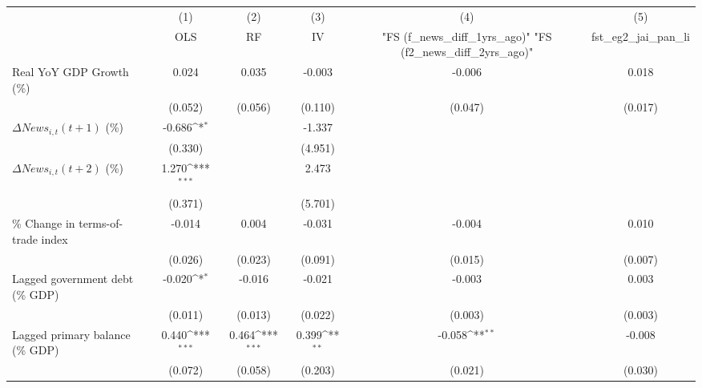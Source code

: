 {
\def\sym#1{\ifmmode^{#1}\else\(^{#1}\)\fi}
\begin{tabular}{l*{5}{c}}
\toprule
                    &\multicolumn{1}{c}{(1)}&\multicolumn{1}{c}{(2)}&\multicolumn{1}{c}{(3)}&\multicolumn{1}{c}{(4)}&\multicolumn{1}{c}{(5)}\\
                    &\multicolumn{1}{c}{OLS}&\multicolumn{1}{c}{RF}&\multicolumn{1}{c}{IV}&\multicolumn{1}{c}{ "FS (f_news_diff_1yrs_ago)"  "FS (f2_news_diff_2yrs_ago)" }&\multicolumn{1}{c}{fst_eg2_jai_pan_li}\\
\midrule
Real YoY GDP Growth (\%)&       0.024         &       0.035         &      -0.003         &      -0.006         &       0.018         \\
                    &     (0.052)         &     (0.056)         &     (0.110)         &     (0.047)         &     (0.017)         \\
\addlinespace
$ \Delta News_{i,t}(t+1)$ (\%)&      -0.686\sym{*}  &                     &      -1.337         &                     &                     \\
                    &     (0.330)         &                     &     (4.951)         &                     &                     \\
\addlinespace
$ \Delta News_{i,t}(t+2)$ (\%)&       1.270\sym{***}&                     &       2.473         &                     &                     \\
                    &     (0.371)         &                     &     (5.701)         &                     &                     \\
\addlinespace
\% Change in terms-of-trade index&      -0.014         &       0.004         &      -0.031         &      -0.004         &       0.010         \\
                    &     (0.026)         &     (0.023)         &     (0.091)         &     (0.015)         &     (0.007)         \\
\addlinespace
Lagged government debt (\% GDP)&      -0.020\sym{*}  &      -0.016         &      -0.021         &      -0.003         &       0.003         \\
                    &     (0.011)         &     (0.013)         &     (0.022)         &     (0.003)         &     (0.003)         \\
\addlinespace
Lagged primary balance (\% GDP)&       0.440\sym{***}&       0.464\sym{***}&       0.399\sym{**} &      -0.058\sym{**} &      -0.008         \\
                    &     (0.072)         &     (0.058)         &     (0.203)         &     (0.021)         &     (0.030)         \\

\end{tabular}}
